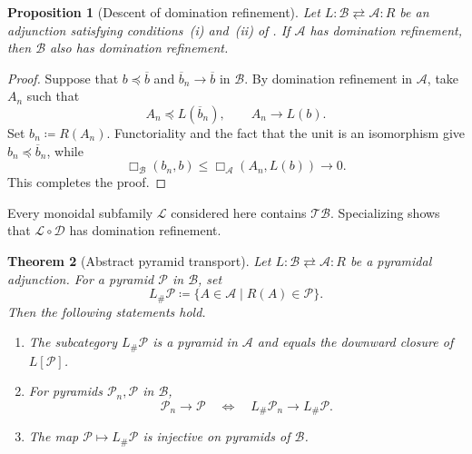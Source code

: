 \documentclass{amsart}
\theoremstyle{plain}
\newtheorem{theorem}{Theorem}[section]
\newtheorem{proposition}[theorem]{Proposition}
\theoremstyle{definition}
\theoremstyle{remark}
\newcommand{\D}{\mathcal{D}}
\renewcommand{\L}{\mathcal{L}}
\newcommand{\TB}{\mathcal{TB}}
\begin{document}
\begin{proposition}[Descent of domination refinement]
\label{prop:domination-refinement-descends}
Let $L\colon\mathcal B\rightleftarrows\mathcal A\colon R$ be an adjunction satisfying conditions~\textup{(i)} and~\textup{(ii)} of . If $\mathcal A$ has domination refinement, then $\mathcal B$ also has domination refinement.
\end{proposition}

\begin{proof}
Suppose that $b\preceq\overline b$ and $\overline b_n\to\overline b$ in $\mathcal B$. By domination refinement in $\mathcal A$, take $A_n$ such that
\[A_n\preceq L(\overline b_n),\qquad A_n\longrightarrow L(b).\]
Set $b_n\coloneqq R(A_n)$. Functoriality and the fact that the unit is an isomorphism give $b_n\preceq\overline b_n$, while
\[\Box_{\mathcal B}(b_n,b)\leq\Box_{\mathcal A}(A_n,L(b))\longrightarrow0.\]
This completes the proof.
\end{proof}

Every monoidal subfamily $\L$ considered here contains $\TB$. Specializing \cite[Lemma~5.4]{gds2} shows that $\L\circ\D$ has domination refinement.

\begin{theorem}[Abstract pyramid transport]
\label{thm:abstract-pyramid-transport}
Let $L\colon\mathcal B\rightleftarrows\mathcal A\colon R$ be a pyramidal adjunction. For a pyramid $\mathcal P$ in $\mathcal B$, set
\begin{equation}
\label{eq:pyramid-transport}
L_{\#}\mathcal P\coloneqq\{A\in\mathcal A\mid R(A)\in\mathcal P\}.
\end{equation}
Then the following statements hold.
\begin{enumerate}[label=\textup{(\arabic*)}]
\item The subcategory $L_{\#}\mathcal P$ is a pyramid in $\mathcal A$ and equals the downward closure of $L[\mathcal P]$.
\item For pyramids $\mathcal P_n,\mathcal P$ in $\mathcal B$,
\[
\mathcal P_n\longrightarrow\mathcal P
\quad\Longleftrightarrow\quad
L_{\#}\mathcal P_n\longrightarrow L_{\#}\mathcal P.
\]
\item The map $\mathcal P\mapsto L_{\#}\mathcal P$ is injective on pyramids of $\mathcal B$.
\end{enumerate}
\end{theorem}
\end{document}
